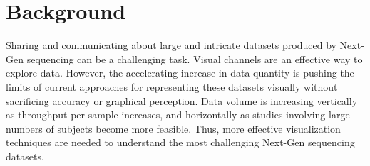 \documentclass{bmcart}
\begin{document}
\begin{frontmatter}
\begin{abstractbox}
\begin{keyword}
\end{keyword}


\end{abstractbox}
%

\end{frontmatter}



\section*{Background}

Sharing and communicating about large and intricate datasets produced by
Next-Gen sequencing can be a challenging task. Visual channels are an effective
way to explore data. However, the accelerating increase in data quantity is
pushing the limits of current approaches for representing these datasets
visually without sacrificing accuracy or graphical perception.  Data volume is
increasing vertically as throughput per sample increases, and horizontally as
studies involving large numbers of subjects become more feasible.  Thus, more
effective visualization techniques are needed to understand the most
challenging Next-Gen sequencing datasets.
\end{document}
